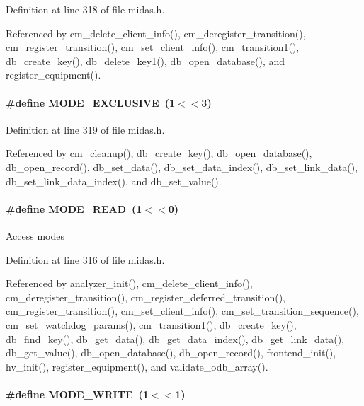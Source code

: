 Definition at line 318 of file midas.h.

Referenced by cm\_\-delete\_\-client\_\-info(), cm\_\-deregister\_\-transition(), cm\_\-register\_\-transition(), cm\_\-set\_\-client\_\-info(), cm\_\-transition1(), db\_\-create\_\-key(), db\_\-delete\_\-key1(), db\_\-open\_\-database(), and register\_\-equipment().
\paragraph[{MODE\_\-EXCLUSIVE}]{\setlength{\rightskip}{0pt plus 5cm}\#define MODE\_\-EXCLUSIVE~(1$<$$<$3)}\hfill\label{group__mdefineh_ga30d5288912bc752abecc2e2188749c53}


Definition at line 319 of file midas.h.

Referenced by cm\_\-cleanup(), db\_\-create\_\-key(), db\_\-open\_\-database(), db\_\-open\_\-record(), db\_\-set\_\-data(), db\_\-set\_\-data\_\-index(), db\_\-set\_\-link\_\-data(), db\_\-set\_\-link\_\-data\_\-index(), and db\_\-set\_\-value().
\paragraph[{MODE\_\-READ}]{\setlength{\rightskip}{0pt plus 5cm}\#define MODE\_\-READ~(1$<$$<$0)}\hfill\label{group__mdefineh_gac4d1baf108e9ce6414088db508d7c182}
Access modes 

Definition at line 316 of file midas.h.

Referenced by analyzer\_\-init(), cm\_\-delete\_\-client\_\-info(), cm\_\-deregister\_\-transition(), cm\_\-register\_\-deferred\_\-transition(), cm\_\-register\_\-transition(), cm\_\-set\_\-client\_\-info(), cm\_\-set\_\-transition\_\-sequence(), cm\_\-set\_\-watchdog\_\-params(), cm\_\-transition1(), db\_\-create\_\-key(), db\_\-find\_\-key(), db\_\-get\_\-data(), db\_\-get\_\-data\_\-index(), db\_\-get\_\-link\_\-data(), db\_\-get\_\-value(), db\_\-open\_\-database(), db\_\-open\_\-record(), frontend\_\-init(), hv\_\-init(), register\_\-equipment(), and validate\_\-odb\_\-array().
\paragraph[{MODE\_\-WRITE}]{\setlength{\rightskip}{0pt plus 5cm}\#define MODE\_\-WRITE~(1$<$$<$1)}\hfill\label{group__mdefineh_gab8fac4c725bb7d4b05ae138c07ef54af}


